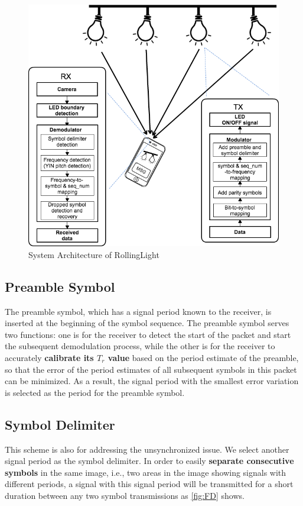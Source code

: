 \begin{figure}[!t] %
  \hspace{-1em}
  \includegraphics[scale=0.375]{pic/arch.png} 
  \caption{System Architecture of RollingLight}
  \label{fig:SystemArchitecture}
\end{figure}

\subsection{Preamble Symbol} 
The preamble symbol, which has a signal period known to the receiver, is inserted at the beginning of the symbol sequence.
The preamble symbol serves two functions: one is for the receiver to detect the start of the packet and start the subsequent demodulation process, while the other is for the receiver to accurately \textbf{calibrate its $T_r$ value} based on the period estimate of the preamble, so that the error of the period estimates of all subsequent symbols in this packet can be minimized. As a result, the signal period with the smallest error variation is selected as the period for the preamble symbol. %

\subsection{Symbol Delimiter}
This scheme is also for addressing the unsynchronized issue.
We select another signal period as the symbol delimiter.
In order to easily \textbf{separate consecutive symbols} in the same image, i.e., two areas in the image showing signals with different periods, a signal with this signal period will be transmitted for a short duration between any two symbol transmissions as \autoref{fig:FD} shows. 

